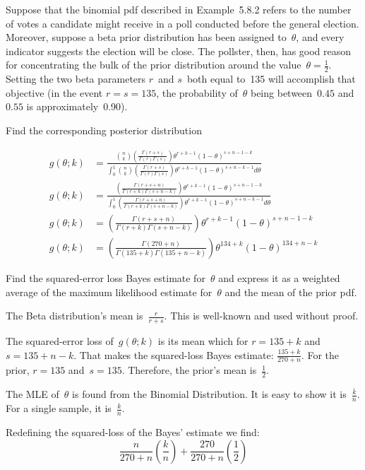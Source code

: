 \begin{problem}
   Suppose that the binomial pdf described in Example~5.8.2 refers to the number of votes a candidate might receive in a poll conducted before the general election. Moreover, suppose a beta prior distribution has been assigned to~$\theta$, and every indicator suggests the election will be close.  The pollster, then, has good reason for concentrating the bulk of the prior distribution around the value~${\theta = \frac{1}{2}}$.  Setting the two beta parameters $r$~and $s$~both equal to~135 will accomplish that objective (in the event ${r = s = 135}$, the probability of~$\theta$ being between~$0.45$ and~$0.55$ is approximately~0.90).
\end{problem}

\begin{subproblem}
  Find the corresponding posterior distribution
\end{subproblem}
\begin{align}
  g(\theta;k) &= \frac{\binom{n}{k} \left(\frac{\Gamma(r+s)}{\Gamma(r)\Gamma(s)}\right) \theta^{r + k - 1} (1 - \theta)^{s+n-1-k}}{\int_{0}^{1} \binom{n}{k} \left(\frac{\Gamma(r+s)}{\Gamma(r)\Gamma(s)}\right) \theta^{r+k-1} (1 - \theta)^{s+n-k-1} d\theta} \\
  g(\theta;k) &= \frac{\left(\frac{\Gamma(r+s+n)}{\Gamma(r+k)\Gamma(s + n - k)}\right) \theta^{r + k - 1} (1 - \theta)^{s+n-1-k}}{\int_{0}^{1} \left(\frac{\Gamma(r+s+n)}{\Gamma(r+k)\Gamma(s + n -k)}\right) \theta^{r+k-1} (1 - \theta)^{s+n-k-1} d\theta} \\
  g(\theta;k) &= \left(\frac{\Gamma(r+s+n)}{\Gamma(r+k)\Gamma(s + n - k)}\right) \theta^{r + k - 1} (1 - \theta)^{s+n-1-k} \\
  g(\theta;k) &= \left(\frac{\Gamma(270+n)}{\Gamma(135+k)\Gamma(135 + n - k)}\right) \theta^{134 + k} (1 - \theta)^{134+n-k}
\end{align}

\begin{subproblem}
  Find the squared-error loss Bayes estimate for~$\theta$ and express it as a weighted average of the maximum likelihood estimate for~$\theta$ and the mean of the prior pdf.
\end{subproblem}
The Beta distribution's mean is~${\frac{r}{r+s}}$.  This is well-known and used without proof.

\noindent
The squared-error loss of~${g(\theta;k)}$ is its mean which for ${r=135+k}$ and ${s = 135 + n - k}$.  That makes the squared-loss Bayes estimate: ${\frac{135 + k}{270 + n}}$. For the prior, ${r=135}$ and~${s=135}$.   Therefore, the prior's mean is~${\frac{1}{2}}$.

\noindent
The MLE of~$\theta$ is found from the Binomial Distribution.  It is easy to show it is~${\frac{\bar{k}}{n}}$.  For a single sample, it is~$\frac{k}{n}$.

\noindent
Redefining the squared-loss of the Bayes' estimate we find:
\begin{equation}
  \boxed{\frac{n}{270 + n} \left(\frac{k}{n}\right) + \frac{270}{270+n} \left(\frac{1}{2}\right)}
\end{equation}
